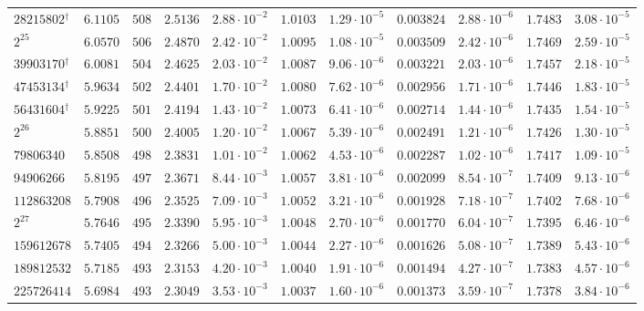 {\begin{longtable}{@{}lrrrrrrrrrr@{}}
$28215802$$^\dagger$ & $6.1105$ & $508$ & $2.5136$ & $2.88\cdot10^{-2}$ & $1.0103$ & $1.29\cdot10^{-5}$ & $0.003824$ & $2.88\cdot10^{-6}$ & $1.7483$ & $3.08\cdot10^{-5}$\\
$2^{25}$ & $6.0570$ & $506$ & $2.4870$ & $2.42\cdot10^{-2}$ & $1.0095$ & $1.08\cdot10^{-5}$ & $0.003509$ & $2.42\cdot10^{-6}$ & $1.7469$ & $2.59\cdot10^{-5}$\\
$39903170$$^\dagger$ & $6.0081$ & $504$ & $2.4625$ & $2.03\cdot10^{-2}$ & $1.0087$ & $9.06\cdot10^{-6}$ & $0.003221$ & $2.03\cdot10^{-6}$ & $1.7457$ & $2.18\cdot10^{-5}$\\
$47453134$$^\dagger$ & $5.9634$ & $502$ & $2.4401$ & $1.70\cdot10^{-2}$ & $1.0080$ & $7.62\cdot10^{-6}$ & $0.002956$ & $1.71\cdot10^{-6}$ & $1.7446$ & $1.83\cdot10^{-5}$\\
$56431604$$^\dagger$ & $5.9225$ & $501$ & $2.4194$ & $1.43\cdot10^{-2}$ & $1.0073$ & $6.41\cdot10^{-6}$ & $0.002714$ & $1.44\cdot10^{-6}$ & $1.7435$ & $1.54\cdot10^{-5}$\\
$2^{26}$ & $5.8851$ & $500$ & $2.4005$ & $1.20\cdot10^{-2}$ & $1.0067$ & $5.39\cdot10^{-6}$ & $0.002491$ & $1.21\cdot10^{-6}$ & $1.7426$ & $1.30\cdot10^{-5}$\\
$79806340$ & $5.8508$ & $498$ & $2.3831$ & $1.01\cdot10^{-2}$ & $1.0062$ & $4.53\cdot10^{-6}$ & $0.002287$ & $1.02\cdot10^{-6}$ & $1.7417$ & $1.09\cdot10^{-5}$\\
$94906266$ & $5.8195$ & $497$ & $2.3671$ & $8.44\cdot10^{-3}$ & $1.0057$ & $3.81\cdot10^{-6}$ & $0.002099$ & $8.54\cdot10^{-7}$ & $1.7409$ & $9.13\cdot10^{-6}$\\
$112863208$ & $5.7908$ & $496$ & $2.3525$ & $7.09\cdot10^{-3}$ & $1.0052$ & $3.21\cdot10^{-6}$ & $0.001928$ & $7.18\cdot10^{-7}$ & $1.7402$ & $7.68\cdot10^{-6}$\\
$2^{27}$ & $5.7646$ & $495$ & $2.3390$ & $5.95\cdot10^{-3}$ & $1.0048$ & $2.70\cdot10^{-6}$ & $0.001770$ & $6.04\cdot10^{-7}$ & $1.7395$ & $6.46\cdot10^{-6}$\\
$159612678$ & $5.7405$ & $494$ & $2.3266$ & $5.00\cdot10^{-3}$ & $1.0044$ & $2.27\cdot10^{-6}$ & $0.001626$ & $5.08\cdot10^{-7}$ & $1.7389$ & $5.43\cdot10^{-6}$\\
$189812532$ & $5.7185$ & $493$ & $2.3153$ & $4.20\cdot10^{-3}$ & $1.0040$ & $1.91\cdot10^{-6}$ & $0.001494$ & $4.27\cdot10^{-7}$ & $1.7383$ & $4.57\cdot10^{-6}$\\
$225726414$ & $5.6984$ & $493$ & $2.3049$ & $3.53\cdot10^{-3}$ & $1.0037$ & $1.60\cdot10^{-6}$ & $0.001373$ & $3.59\cdot10^{-7}$ & $1.7378$ & $3.84\cdot10^{-6}$\\

\end{longtable}}
